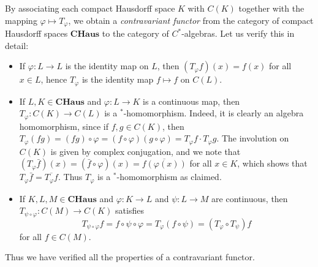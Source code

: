 \begin{remark}
	By associating each compact Hausdorff space $K$ with $C(K)$ together with the mapping $\varphi \mapsto T_\varphi$, we obtain a \emph{contravariant functor} from the category of compact Hausdorff spaces $\mathbf{CHaus}$ to the category of $C^*$-algebras. Let us verify this in detail:
	\begin{itemize}
		\item If $\varphi:L \to L$ is the identity map on $L$, then $(T_\varphi f)(x) = f(x)$ for all $x\in L$, hence $T_\varphi$ is the identity map $f \mapsto f$ on $C(L)$.
		\item If $L,K \in \mathbf{CHaus}$ and $\varphi:L \to K$ is a continuous map, then $T_\varphi : C(K) \to C(L)$ is a $^*$-homomorphism. Indeed, it is clearly an algebra homomorphism, since if $f,g \in C(K)$, then $T_\varphi(fg) = (fg)\circ \varphi = (f\circ\varphi)(g\circ\varphi) = T_\varphi f \cdot T_\varphi g$. The involution on $C(K)$ is given by complex conjugation, and we note that $(T_{\varphi}\bar{f})(x) = (\bar{f}\circ\varphi)(x) = \overline{f(\varphi(x))}$ for all $x\in K$, which shows that $T_\varphi \bar{f} = \overline{T_\varphi f}$. Thus $T_\varphi$ is a $^*$-homomorphism as claimed.
		\item If $K,L,M \in \mathbf{CHaus}$ and $\varphi:K \to L$ and $\psi:L \to M$ are continuous, then $T_{\psi\circ\varphi}:C(M) \to C(K)$ satisfies
		\begin{equation*}
			T_{\psi \circ \varphi}f = f\circ\psi\circ\varphi = T_\varphi(f\circ\psi) = (T_\varphi \circ T_\psi)f
		\end{equation*}
		for all $f\in C(M)$.
	\end{itemize}
	Thus we have verified all the properties of a contravariant functor.
\end{remark}